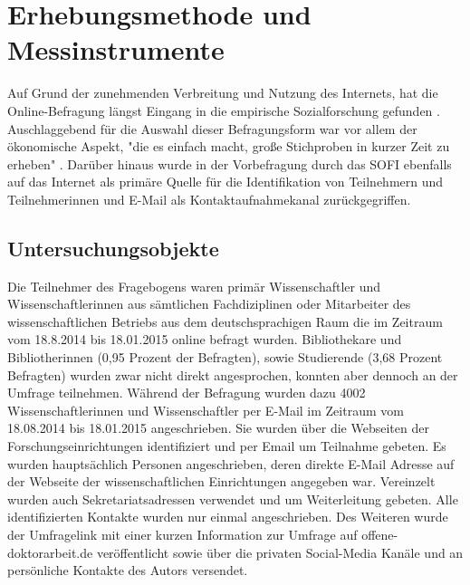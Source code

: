 \section{Erhebungsmethode und Messinstrumente}

Auf Grund der zunehmenden Verbreitung und Nutzung des Internets, hat die Online-Befragung längst Eingang in die empirische Sozialforschung gefunden \cite{Pannewitz_2002}. Auschlaggebend für die Auswahl dieser Befragungsform war vor allem der ökonomische Aspekt, "die es einfach macht, große Stichproben in kurzer Zeit zu erheben" \cite{eichhorn_2004_online}. Darüber hinaus wurde in der Vorbefragung durch das SOFI ebenfalls auf das Internet als primäre Quelle für die Identifikation von Teilnehmern und Teilnehmerinnen und E-Mail als Kontaktaufnahmekanal zurückgegriffen.

\subsection{Untersuchungsobjekte}

Die Teilnehmer des Fragebogens waren primär Wissenschaftler und Wissenschaftlerinnen aus sämtlichen Fachdiziplinen oder Mitarbeiter des wissenschaftlichen Betriebs aus dem deutschsprachigen Raum die im Zeitraum vom 18.8.2014 bis 18.01.2015 online befragt wurden. Bibliothekare und Bibliotherinnen (0,95 Prozent der Befragten), sowie Studierende (3,68 Prozent Befragten) wurden zwar nicht direkt angesprochen, konnten aber dennoch an der Umfrage teilnehmen. Während der Befragung wurden dazu 4002 Wissenschaftlerinnen und Wissenschaftler per E-Mail im Zeitraum vom 18.08.2014 bis 18.01.2015 angeschrieben. Sie wurden über die Webseiten der Forschungseinrichtungen identifiziert und per Email um Teilnahme gebeten. Es wurden hauptsächlich Personen angeschrieben, deren direkte E-Mail Adresse auf der Webseite der wissenschaftlichen Einrichtungen angegeben war. Vereinzelt wurden auch Sekretariatsadressen verwendet und um Weiterleitung gebeten. Alle identifizierten Kontakte wurden nur einmal angeschrieben.  Des Weiteren wurde der Umfragelink mit einer kurzen Information zur Umfrage auf offene-doktorarbeit.de veröffentlicht sowie über die privaten Social-Media Kanäle und an persönliche Kontakte des Autors versendet.

